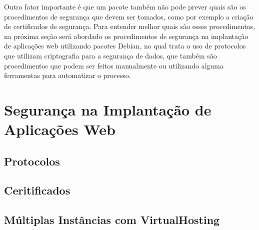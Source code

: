 Outro fator importante é que um pacote também não pode prever quais são os procedimentos
de segurança que devem ser tomados, como por exemplo a criação de certificados de
segurança. Para entender melhor quais são esses procedimentos, na próxima seção
será abordado os procedimentos de segurança na implantação de aplicações web utilizando
pacotes Debian, no qual trata o uso de protocolos que utilizam criptografia para a segurança de dados,
que também são procedimentos que podem ser feitos manualmente ou utilizando alguma
ferramentas para automatizar o processo.

\section{Segurança na Implantação de Aplicações Web}
\label{sec:seguranca}


\subsection{Protocolos}


\subsection{Ceritificados}


\subsection{Múltiplas Instâncias com VirtualHosting}
